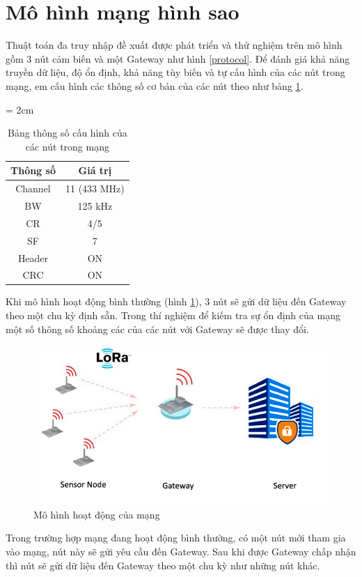\section{Mô hình mạng hình sao}
Thuật toán đa truy nhập đề xuất được phát triển và thử nghiệm trên mô hình gồm 3 nút cảm biến và một Gateway như hình \ref{protocol}{}. Để đánh giá khả năng truyền dữ liệu, độ ổn định, khả năng tùy biến và tự cấu hình của các nút trong mạng, em cấu hình các thông số cơ bản của các nút theo như bảng \ref{bang3_1}{}.
\begin{table}[h]
	\tabcolsep = 2cm
    \centering
    \caption{Bảng thông số cấu hình của các nút trong mạng}
    \begin{tabular}{|c|c|}
     	\hline
     	Thông số & Giá trị  \\
     	\hline
     	Channel & 11 (433 MHz)\\
     	\hline
     	BW & 125 kHz\\
     	\hline
     	CR & 4/5\\
     	\hline
     	SF & 7\\
     	\hline
     	Header & ON\\
     	\hline
     	CRC & ON\\
     	\hline
    \end{tabular}
    \label{bang3_1}
\end{table}
\par 
Khi mô hình hoạt động bình thường (hình \ref{normal}{}), 3 nút sẽ gửi dữ liệu đến Gateway theo một chu kỳ định sẵn. Trong thí nghiệm để kiếm tra sự ổn định của mạng một số thông số khoảng các của các nút với Gateway sẽ được thay đổi.\\
\begin{center}
\begin{figure}[h]
	\begin{center}
		\includegraphics[scale=0.35]{image/normal}
	\end{center}
	\caption{Mô hình hoạt động của mạng}
	\label{normal}
\end{figure}
\end{center}
\par 
Trong trường hợp mạng đang hoạt động bình thường, có một nút mới tham gia vào mạng, nút này sẽ gửi yêu cầu đến Gateway. Sau khi được Gateway chấp nhận thì nút sẽ gửi dữ liệu đến Gateway theo một chu kỳ như những nút khác.
